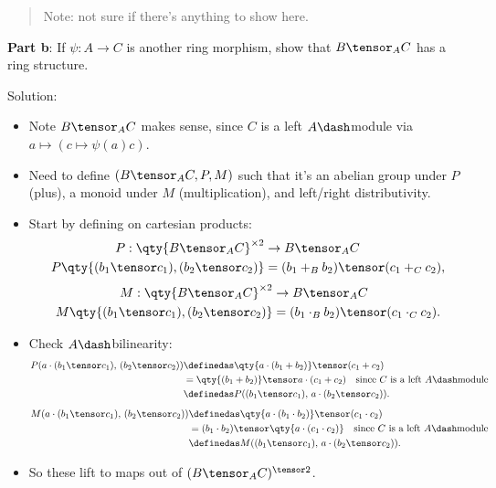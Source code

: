 \begin{quote}
Note: not sure if there's anything to show here.
\end{quote}

\textbf{Part b}: If \(\psi: A\to C\) is another ring morphism, show that
\(B\tensor_A C\) has a ring structure.

Solution:

\begin{itemize}
\item
  Note \(B\tensor_A C\) makes sense, since \(C\) is a left
  \(A\dash\)module via \(a\mapsto (c\mapsto \psi(a)c)\).
\item
  Need to define \((B\tensor_A C, P, M)\) such that it's an abelian
  group under \(P\) (plus), a monoid under \(M\) (multiplication), and
  left/right distributivity.
\item
  Start by defining on cartesian products: \begin{align*}
  P: \qty{B\tensor_A C}^{\times 2} &\to B\tensor_A C \\
  P\qty{ (b_1 \tensor c_1), (b_2\tensor c_2)} &= (b_1 +_B b_2) \tensor (c_1 +_C c_2)
  ,\end{align*} \begin{align*}
  M: \qty{B\tensor_A C}^{\times 2} &\to B\tensor_A C \\
  M\qty{ (b_1 \tensor c_1),  (b_2\tensor c_2)} &= (b_1 \cdot_B b_2) \tensor (c_1 \cdot_C c_2)
  .\end{align*}
\item
  Check \(A\dash\)bilinearity: \begin{align*}
  P(a\cdot (b_1\tensor c_1),\, (b_2\tensor c_2)) 
  &\definedas \qty{ a \cdot (b_1 + b_2)} \tensor (c_1 + c_2)  \\
  &= \qty{ (b_1 + b_2)} \tensor a\cdot (c_1 + c_2) \quad\text{since $C$ is a left $A\dash$module} \\
  &\definedas P((b_1\tensor c_1),\, a\cdot (b_2\tensor c_2)) 
  .\end{align*} \begin{align*}
  M(a\cdot (b_1\tensor c_1),\, (b_2\tensor c_2)) 
  &\definedas \qty{a\cdot (b_1 \cdot b_2)} \tensor (c_1 \cdot c_2) \\
  &= (b_1 \cdot b_2) \tensor \qty{ a\cdot (c_1 \cdot c_2) } \quad\text{since $C$ is a left $A\dash$module} \\
  &\definedas M((b_1\tensor c_1),\, a\cdot (b_2\tensor c_2)) 
  .\end{align*}
\item
  So these lift to maps out of \((B\tensor_A C)^{\tensor 2}\).

\end{itemize}
